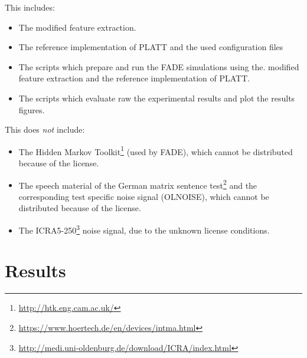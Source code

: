 \documentclass[10pt,a4paper,twocolumn]{article}
\begin{document}
This includes:
\begin{itemize}
	\item The modified feature extraction.
	\item The reference implementation of PLATT and the used configuration files
	\item The scripts which prepare and run the FADE simulations using the. modified feature extraction and the reference implementation of PLATT.
	\item The scripts which evaluate raw the experimental results and plot the results figures.
\end{itemize}

This does \emph{not} include:
\begin{itemize}
	\item The Hidden Markov Toolkit\footnote{\url{http://htk.eng.cam.ac.uk/}} (used by FADE), which cannot be distributed because of the license.
	\item The speech material of the German matrix sentence test\footnote{\url{https://www.hoertech.de/en/devices/intma.html}} and the corresponding test specific noise signal (OLNOISE), which cannot be distributed because of the license.
	\item The ICRA5-250\footnote{\url{http://medi.uni-oldenburg.de/download/ICRA/index.html}} noise signal, due to the unknown license conditions.
\end{itemize}


\section*{Results}
\label{sec:results}
%
\end{document}
